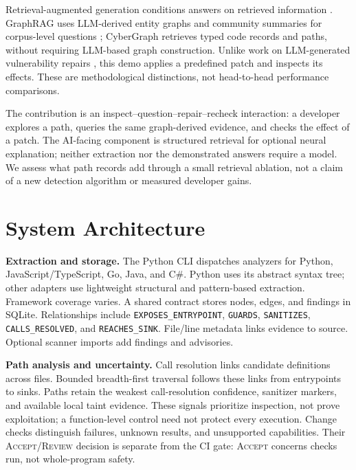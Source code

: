 \documentclass[letterpaper]{article}
\begin{document}
Retrieval-augmented generation conditions answers on retrieved information
\citep{lewis2020}. GraphRAG uses LLM-derived entity graphs and community
summaries for corpus-level questions \citep{edge2025}; CyberGraph retrieves
typed code records and paths, without requiring LLM-based graph construction.
Unlike work on LLM-generated vulnerability repairs \citep{pearce2023}, this
demo applies a predefined patch and inspects its effects. These are
methodological distinctions, not head-to-head performance comparisons.

The contribution is an inspect--question--repair--recheck interaction: a
developer explores a path, queries the same graph-derived evidence, and checks
the effect of a patch. The AI-facing component is structured retrieval for
optional neural explanation; neither extraction nor the demonstrated answers
require a model. We assess what path records add through a small retrieval
ablation, not a claim of a new detection algorithm or measured developer gains.

\section{System Architecture}
\textbf{Extraction and storage.}
The Python CLI dispatches analyzers for Python, JavaScript/TypeScript, Go,
Java, and C\#. Python uses its abstract syntax tree; other adapters use
lightweight structural and pattern-based extraction. Framework coverage varies.
A shared contract stores nodes, edges, and findings in SQLite. Relationships include
\texttt{EXPOSES\_ENTRYPOINT}, \texttt{GUARDS}, \texttt{SANITIZES},
\texttt{CALLS\_RESOLVED}, and \texttt{REACHES\_SINK}. File/line metadata links
evidence to source. Optional scanner imports add findings and advisories.

\textbf{Path analysis and uncertainty.}
Call resolution links candidate definitions across files. Bounded breadth-first
traversal follows these links from entrypoints to sinks. Paths retain the
weakest call-resolution confidence, sanitizer markers, and available local
taint evidence. These signals prioritize inspection, not prove exploitation;
a function-level control need not protect every execution. Change checks
distinguish failures, unknown results, and unsupported capabilities. Their
\textsc{Accept}/\textsc{Review} decision is separate from the CI gate:
\textsc{Accept} concerns checks run, not whole-program safety.
\end{document}
